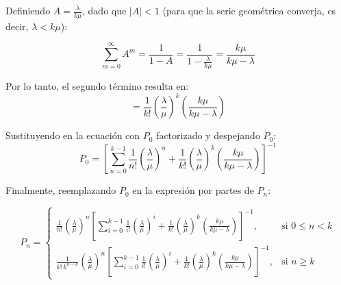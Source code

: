 \documentclass[12pt]{article}
\begin{document}
Definiendo $A = \frac{\lambda}{k\mu}$, dado que $|A| < 1$ (para que la serie geométrica converja, es decir, $\lambda < k\mu$):

\[
\sum_{m=0}^{\infty} A^m = \frac{1}{1 - A} = \frac{1}{1 - \frac{\lambda}{k\mu}} = \frac{k\mu}{k\mu - \lambda}
\]

Por lo tanto, el segundo término resulta en:
\[
= \frac{1}{k!} \left( \frac{\lambda}{\mu} \right)^k \left( \frac{k\mu}{k\mu - \lambda} \right)
\]

Sustituyendo en la ecuación con $P_0$ factorizado y despejando $P_0$:
\[
P_0 = \left[ \sum_{n=0}^{k-1} \frac{1}{n!} \left( \frac{\lambda}{\mu} \right)^n + \frac{1}{k!} \left( \frac{\lambda}{\mu} \right)^k \left( \frac{k\mu}{k\mu - \lambda} \right) \right]^{-1}
\]

Finalmente, reemplazando $P_0$ en la expresión por partes de $P_n$:

\[
P_n = 
\begin{cases} 
\displaystyle \frac{1}{n!} \left( \frac{\lambda}{\mu} \right)^n \left[ \sum_{i=0}^{k-1} \frac{1}{i!} \left( \frac{\lambda}{\mu} \right)^i + \frac{1}{k!} \left( \frac{\lambda}{\mu} \right)^k \left( \frac{k\mu}{k\mu - \lambda} \right) \right]^{-1}, & \text{si } 0 \le n < k \\[2em]
\displaystyle \frac{1}{k! \, k^{n-k}} \left( \frac{\lambda}{\mu} \right)^n \left[ \sum_{i=0}^{k-1} \frac{1}{i!} \left( \frac{\lambda}{\mu} \right)^i + \frac{1}{k!} \left( \frac{\lambda}{\mu} \right)^k \left( \frac{k\mu}{k\mu - \lambda} \right) \right]^{-1}, & \text{si } n \ge k 
\end{cases}
\]
\end{document}
